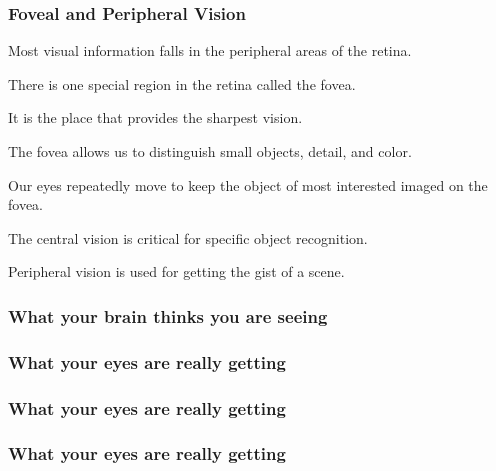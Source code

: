 \documentclass[12pt]{beamer}\usepackage[]{graphicx}\usepackage[]{color}
\begin{document}
\begin{frame}
\frametitle{Foveal and Peripheral Vision}

\bbi
  \item Most visual information falls in the peripheral areas of the retina.
  \item There is one special region in the retina called the fovea.
  \item It is the place that provides the sharpest vision.
  \item The fovea allows us to distinguish small objects, detail, and color.
  \item Our eyes repeatedly move to keep the object of most interested imaged
  on the fovea.
  \item The central vision is critical for specific object recognition.
  \item Peripheral vision is used for getting the gist of a scene.
\ei

\end{frame}


\begin{frame}
\frametitle{What your brain thinks you are seeing}
\begin{center}
\end{center}
\end{frame}


\begin{frame}
\frametitle{What your eyes are really getting}
\begin{center}
\end{center}
\end{frame}


\begin{frame}
\frametitle{What your eyes are really getting}
\begin{center}
\end{center}
\end{frame}


\begin{frame}
\frametitle{What your eyes are really getting}
\begin{center}
\end{center}
\end{frame}
\end{document}
